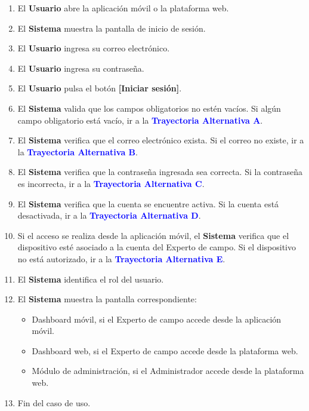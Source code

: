 \begin{enumerate}
    \item El \textbf{Usuario} abre la aplicación móvil o la plataforma web.
    \item El \textbf{Sistema} muestra la pantalla de inicio de sesión.
    \item El \textbf{Usuario} ingresa su correo electrónico.
    \item El \textbf{Usuario} ingresa su contraseña.
    \item El \textbf{Usuario} pulsa el botón \textbf{[Iniciar sesión]}.
    \item El \textbf{Sistema} valida que los campos obligatorios no estén vacíos.  
    Si algún campo obligatorio está vacío, ir a la \textbf{\textcolor{blue}{Trayectoria Alternativa A}}.
    \item El \textbf{Sistema} verifica que el correo electrónico exista.  
    Si el correo no existe, ir a la \textbf{\textcolor{blue}{Trayectoria Alternativa B}}.
    \item El \textbf{Sistema} verifica que la contraseña ingresada sea correcta.  
    Si la contraseña es incorrecta, ir a la \textbf{\textcolor{blue}{Trayectoria Alternativa C}}.
    \item El \textbf{Sistema} verifica que la cuenta se encuentre activa.  
    Si la cuenta está desactivada, ir a la \textbf{\textcolor{blue}{Trayectoria Alternativa D}}.
    \item Si el acceso se realiza desde la aplicación móvil, el \textbf{Sistema} verifica que el dispositivo esté asociado a la cuenta del Experto de campo.  
    Si el dispositivo no está autorizado, ir a la \textbf{\textcolor{blue}{Trayectoria Alternativa E}}.
    \item El \textbf{Sistema} identifica el rol del usuario.
    \item El \textbf{Sistema} muestra la pantalla correspondiente:
    \begin{itemize}
        \item Dashboard móvil, si el Experto de campo accede desde la aplicación móvil.
        \item Dashboard web, si el Experto de campo accede desde la plataforma web.
        \item Módulo de administración, si el Administrador accede desde la plataforma web.
    \end{itemize}
    \item Fin del caso de uso.
\end{enumerate}

